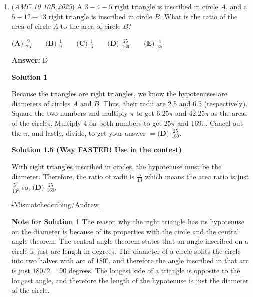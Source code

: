 \begin{enumerate}
 $D$ gives $47 \cdot 0.86 = \text{\$40.42}$,

 And $E$ gives $49 \cdot 0.86 = \text{\$42.14}$.

 Therefore, our answer is $\boxed{\textbf{(B) }50}$



	\item (\textit{AMC 10 10B 2023}) A $3-4-5$ right triangle is inscribed in circle $A$, and a $5-12-13$ right triangle is inscribed in circle $B$. What is the ratio of the area of circle $A$ to the area of circle $B$?


 $\textbf{(A) }\frac{9}{25}\qquad\textbf{(B) }\frac{1}{9}\qquad\textbf{(C) }\frac{1 }{5}\qquad\textbf{(D) }\frac{25}{169}\qquad\textbf{(E) }\frac{4}{25}$

 \textbf{Answer: }D



\textbf{Solution 1}

Because the triangles are right triangles, we know the hypotenuses are diameters of circles $A$ and $B$. Thus, their radii are 2.5 and 6.5 (respectively). Square the two numbers and multiply $\pi$ to get $6.25\pi$ and $42.25\pi$ as the areas of the circles. Multiply 4 on both numbers to get $25\pi$ and $169\pi$. Cancel out the $\pi$, and lastly, divide, to get your answer $=\boxed{\textbf{(D) }\frac{25}{169}}.$




\textbf{Solution 1.5 (Way FASTER! Use in the contest)}

With right triangles inscribed in circles, the hypotenuse must be the diameter. Therefore, the ratio of radii is $\frac{5}{13}$  which means the  area ratio is just $\frac{5^2}{13^2}$  so,  $\boxed{\textbf{(D) }\frac{25}{169}}.$

 -Mismatchedcubing/Andrew\_

 \textbf{Note for Solution 1} The reason why the right triangle has its hypotenuse on the diameter is because of its properties with the circle and the central angle theorem. The central angle theorem states that an angle inscribed on a circle is just arc length in degrees. The diameter of a circle splits the circle into two halves with arc of \( 180^\circ \), and therefore the angle inscribed in that arc is just \( 180/2 = 90 \) degrees. The longest side of a triangle is opposite to the longest angle, and therefore the length of the hypotenuse is just the diameter of the circle.

 




\end{enumerate}
